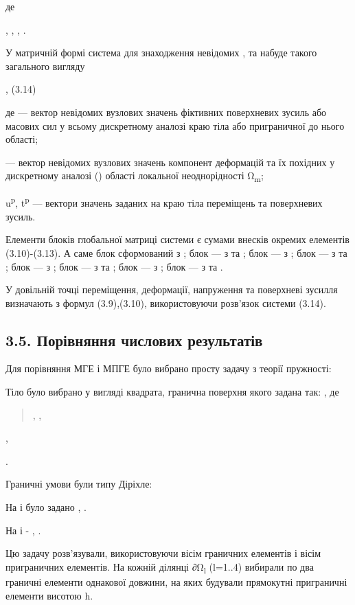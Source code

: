 де

, , , .

У матричній формі система для знаходження невідомих , та набуде такого
загального вигляду

, (3.14)

де --- вектор невідомих вузлових значень фіктивних поверхневих зусиль
або масових сил у всьому дискретному аналозі краю тіла або приграничної
до нього області;

--- вектор невідомих вузлових значень компонент деформацій та їх
похідних у дискретному аналозі () області локальної неоднорідності
Ω\textsubscript{m};

u\textsuperscript{p}, t\textsuperscript{p} --- вектори значень заданих
на краю тіла переміщень та поверхневих зусиль.

Елементи блоків глобальної матриці системи є сумами внесків окремих
елементів (3.10)-(3.13). А саме блок сформований з ; блок --- з та ;
блок --- з ; блок --- з та ; блок --- з ; блок --- з та ; блок --- з ;
блок --- з та .

У довільній точці переміщення, деформації, напруження та поверх­неві
зусилля визначають з формул (3.9),(3.10), використовуючи розв'язок
системи (3.14).

\hypertarget{ux43fux43eux440ux456ux432ux43dux44fux43dux43dux44f-ux447ux438ux441ux43bux43eux432ux438ux445-ux440ux435ux437ux443ux43bux44cux442ux430ux442ux456ux432}{%
\subsection{3.5. Порівняння числових
результатів}\label{ux43fux43eux440ux456ux432ux43dux44fux43dux43dux44f-ux447ux438ux441ux43bux43eux432ux438ux445-ux440ux435ux437ux443ux43bux44cux442ux430ux442ux456ux432}}

Для порівняння МГЕ і МПГЕ було вибрано просту задачу з теорії пружності:

Тіло було вибрано у вигляді квадрата, гранична поверхня якого задана
так: , де

\begin{quote}
, ,
\end{quote}

,

.

Граничні умови були типу Діріхле:

На і було задано , .

На і - , .

Цю задачу розв'язували, використовуючи вісім граничних елементів і вісім
приграничних елементів. На кожній ділянці ∂Ω\textsubscript{l} (l=1..4)
вибирали по два граничні елементи однакової довжини, на яких будували
прямокутні приграничні елементи висотою h.

